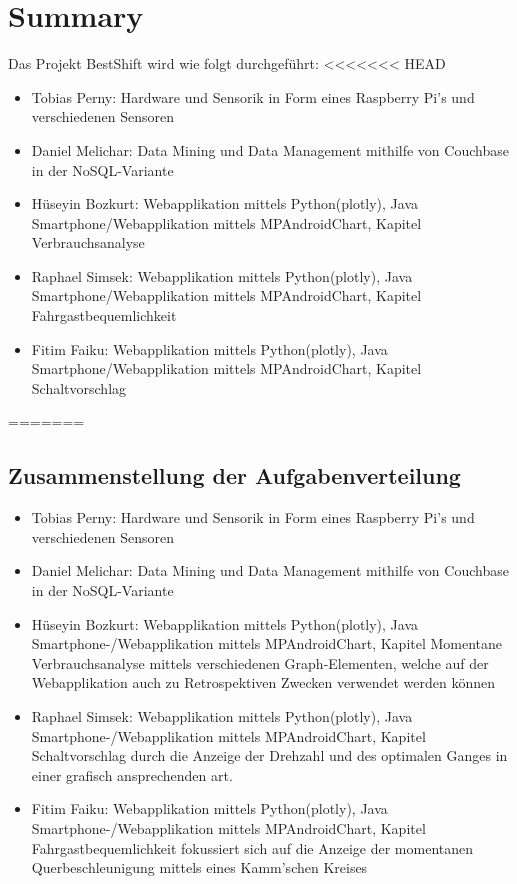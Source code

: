 \chapter{Summary}
Das Projekt BestShift wird wie folgt durchgeführt:
<<<<<<< HEAD
	\begin{itemize}
		\item Tobias Perny: Hardware und Sensorik in Form eines Raspberry Pi's und verschiedenen Sensoren 
		\item Daniel Melichar: Data Mining und Data Management mithilfe von Couchbase in der NoSQL-Variante
		\item Hüseyin Bozkurt: Webapplikation mittels Python(plotly), Java Smartphone/Webapplikation mittels MPAndroidChart, Kapitel Verbrauchsanalyse 
		\item Raphael Simsek:  Webapplikation mittels Python(plotly), Java Smartphone/Webapplikation mittels MPAndroidChart, Kapitel Fahrgastbequemlichkeit
		\item Fitim Faiku:     Webapplikation mittels Python(plotly), Java Smartphone/Webapplikation mittels MPAndroidChart, Kapitel Schaltvorschlag
	\end{itemize}

=======
\section{Zusammenstellung der Aufgabenverteilung}
 \begin{itemize}
	 \item Tobias Perny: Hardware und Sensorik in Form eines Raspberry Pi's und verschiedenen Sensoren 
	 \item Daniel Melichar: Data Mining und Data Management mithilfe von Couchbase in der NoSQL-Variante
	 \item Hüseyin Bozkurt: Webapplikation mittels Python(plotly), Java Smartphone-/Webapplikation mittels MPAndroidChart, Kapitel Momentane Verbrauchsanalyse mittels verschiedenen Graph-Elementen, welche auf der Webapplikation auch zu Retrospektiven Zwecken verwendet werden können 
	 \item Raphael Simsek: Webapplikation mittels Python(plotly), Java Smartphone-/Webapplikation mittels MPAndroidChart, Kapitel Schaltvorschlag durch die Anzeige der Drehzahl und des optimalen Ganges in einer grafisch ansprechenden art.
	 \item Fitim Faiku: Webapplikation mittels Python(plotly), Java Smartphone-/Webapplikation mittels MPAndroidChart, Kapitel Fahrgastbequemlichkeit fokussiert sich auf die Anzeige der momentanen Querbeschleunigung mittels eines Kamm'schen Kreises
 \end{itemize}
\newline
